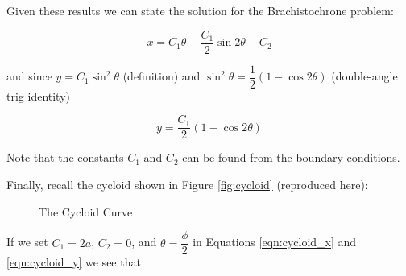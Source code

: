 \documentclass{article}
\theoremstyle{definition}
\begin{document}
\bigskip
\noindent
Given these results we can state the solution for the Brachistochrone 
problem:


\bigskip
\begin{equation}
x = C_1 \theta -  \dfrac{C_1}{2} \sin 2\theta - C_2
\label{eqn:cycloid_x}
\end{equation}

\bigskip
\noindent
and since $y = C_1 \sin^2 \theta$ (definition) and $\sin^2 \theta = \dfrac{1}{2} (1- \cos 2 \theta)$ 
(double-angle trig identity)


\bigskip
\begin{equation}
y = \dfrac{C_1}{2} \left ( 1 - \cos 2 \theta \right )
\label{eqn:cycloid_y}
\end{equation}

\smallskip
\bigskip
\noindent
Note that the constants $C_1$ and $C_2$ can be found from the 
boundary conditions.


\bigskip
\noindent
Finally, recall the cycloid shown in Figure \ref{fig:cycloid} (reproduced here):

\bigskip
\begin{figure}[H]
\caption{The Cycloid Curve}
\label{fig:cycloid1}
\end{figure}

\bigskip
\noindent
If we set $C_1 = 2 a$, $C_2 = 0$, and $\theta = \dfrac{\phi}{2}$
in Equations \ref{eqn:cycloid_x} and \ref{eqn:cycloid_y} we see
that 
\end{document}

